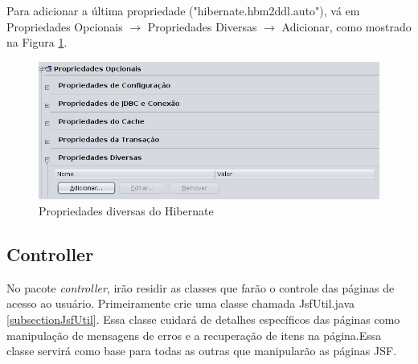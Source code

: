 \documentclass[12pt,a4paper]{article}
\begin{document}
Para adicionar a última propriedade ("hibernate.hbm2ddl.auto"), vá em Propriedades Opcionais $\rightarrow$ Propriedades Diversas $\rightarrow$ Adicionar, como mostrado na Figura \ref{fig:3}.

\begin{figure} [h]
\centering
\includegraphics[width=0.7\linewidth]{3.png}
\caption{Propriedades diversas do Hibernate}
\label{fig:3}
\end{figure}


%

\subsection{Controller}
No pacote \textit{controller}, irão residir as classes que farão o controle das páginas de acesso ao usuário. Primeiramente crie uma classe chamada JsfUtil.java \ref{subsectionJsfUtil}. Essa classe cuidará de detalhes específicos das páginas como manipulação de mensagens de erros e a recuperação de itens na página.Essa classe servirá como base para todas as outras que manipularão as páginas JSF. 
\end{document}
